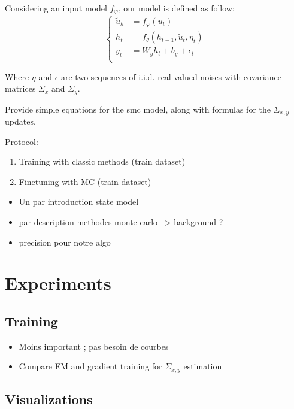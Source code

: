 \documentclass{article}
\begin{document}
Considering an input model $f_\varphi$, our model is defined as follow:
\begin{equation*}
	\left\{
	\begin{aligned}
		\tilde u_h & = f_\varphi(u_t)                        \\
		h_t        & = f_\theta(h_{t-1}, \tilde u_t, \eta_t) \\
		y_t        & = W_y h_t + b_y + \epsilon_t            \\
	\end{aligned}
	\right.
\end{equation*}

Where $\eta$ and $\epsilon$ are two sequences of i.i.d. real valued noises with covariance matrices $\Sigma_x$ and $\Sigma_y$.

Provide simple equations for the smc model, along with formulas for the $\Sigma_{x, y}$ updates.

Protocol:
\begin{enumerate}
	\item Training with classic methods (train dataset)
	\item Finetuning with MC (train dataset)
\end{enumerate}

\begin{itemize}
	\item Un par introduction state model
	\item par description methodes monte carlo --> background ?
	\item precision pour notre algo
\end{itemize}

\section{Experiments}
\label{sec:exp}

\subsection{Training}%
\label{sub:training}

\begin{itemize}
	\item Moins important ; pas besoin de courbes
	\item Compare EM and gradient training for $\Sigma_{x, y}$ estimation
\end{itemize}

\subsection{Visualizations}%
\label{sub:visualizations}
\end{document}
